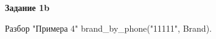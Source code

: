 \documentclass[12pt, a4paper]{extarticle}
\begin{document}
\textbf{Задание 1b} \par
\begin{figure}[h!]	
\end{figure}\par

\begin{figure}[h!]	
\end{figure}\par

\begin{figure}[h!]	
\end{figure}\par

\newpage
Разбор "Примера 4" brand\_by\_phone("11111", Brand). \par 
\end{document}
